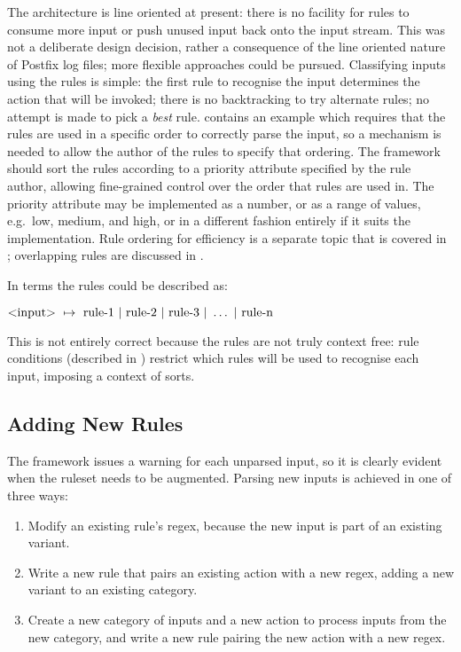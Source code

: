The architecture is line oriented at present: there is no facility for
rules to consume more input or push unused input back onto the input
stream.  This was not a deliberate design decision, rather a consequence of
the line oriented nature of Postfix log files; more flexible approaches
could be pursued.  Classifying inputs using the rules is simple: the first
rule to recognise the input determines the action that will be invoked;
there is no backtracking to try alternate rules; no attempt is made to pick
a \textit{best\/} rule.  
contains an example which requires that the rules are used in a specific
order to correctly parse the input, so a mechanism is needed to allow the
author of the rules to specify that ordering.  The framework should sort
the rules according to a priority attribute specified by the rule author,
allowing fine-grained control over the order that rules are used in.  The
priority attribute may be implemented as a number, or as a range of values,
e.g.\ low, medium, and high, or in a different fashion entirely if it suits
the implementation.  Rule ordering for efficiency is a separate topic that
is covered in ; overlapping rules
are discussed in .

In  terms the rules could be described as:

$\text{\textless{}input\textgreater{}}~\mapsto{}~\text{rule-1}~|~\text{rule-2}~|~\text{rule-3}~|~\dots~|~\text{rule-n}$

This is not entirely correct because the rules are not truly context free:
rule conditions (described in )
restrict which rules will be used to recognise each input, imposing a
context of sorts.

\subsection{Adding New Rules}

The framework issues a warning for each unparsed input, so it is clearly
evident when the ruleset needs to be augmented.  Parsing new inputs is
achieved in one of three ways:

\begin{enumerate}

    \item Modify an existing rule's regex, because the new input is part of
        an existing variant.

    \item Write a new rule that pairs an existing action with a new regex,
        adding a new variant to an existing category.

    \item Create a new category of inputs and a new action to process
        inputs from the new category, and write a new rule pairing the new
        action with a new regex.

\end{enumerate}

